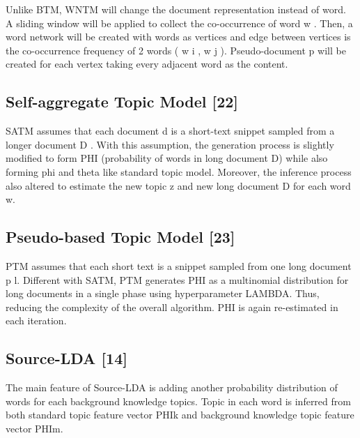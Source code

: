 \documentclass[senior]{IPSstyle}
\begin{document}
Unlike BTM, WNTM will change the document representation instead of word. A sliding window will be applied to collect the co-occurrence of word w . Then, a word network will be created with words as vertices and edge between vertices is the co-occurrence frequency of 2 words ( w i , w j ). Pseudo-document p will be created for each vertex taking every adjacent word as the content.

\subsection{Self-aggregate Topic Model [22]}

SATM assumes that each document d is a short-text snippet sampled from a longer document D . With this assumption, the generation process is slightly modified to form PHI (probability of words in long document D) while also forming phi and theta like standard topic model. Moreover, the inference process also altered to estimate the new topic z and new long document D for each word w.

\subsection{Pseudo-based Topic Model [23]}

PTM assumes that each short text is a snippet sampled from one long document p l. Different with SATM, PTM generates PHI as a multinomial distribution for long documents in a single phase using hyperparameter LAMBDA. Thus, reducing the complexity of the overall algorithm. PHI is again re-estimated in each iteration.

\subsection{Source-LDA [14]}

The main feature of Source-LDA is adding another probability distribution of words for each background knowledge topics. Topic in each word is inferred from both standard topic feature vector PHIk and background knowledge topic feature vector PHIm.
\end{document}
